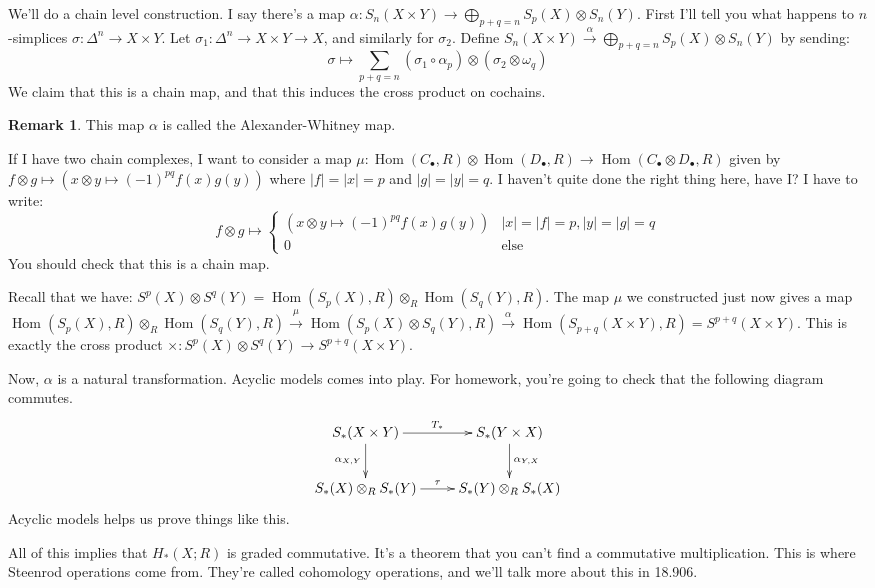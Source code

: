 \documentclass{amsart}
\theoremstyle{theorem}
\theoremstyle{definition}
\newtheorem{remark}[theorem]{Remark}
\DeclareMathOperator{\Hom}{Hom}
\begin{document}
We'll do a chain level construction. I say there's a map $\alpha:S_n(X\times Y)\to \bigoplus_{p+q=n}S_p(X)\otimes S_n(Y)$. First I'll tell you what happens to $n$-simplices $\sigma:\Delta^n\to X\times Y$. Let $\sigma_1:\Delta^n\to X\times Y\to X$, and similarly for $\sigma_2$. Define $S_n(X\times Y)\xrightarrow{\alpha} \bigoplus_{p+q=n}S_p(X)\otimes S_n(Y)$ by sending:
\begin{equation*}
\sigma\mapsto\sum_{p+q=n}(\sigma_1\circ\alpha_p)\otimes(\sigma_2\otimes\omega_q)
\end{equation*}
We claim that this is a chain map, and that this induces the cross product on cochains.
\begin{remark}
This map $\alpha$ is called the Alexander-Whitney map.
\end{remark}
If I have two chain complexes, I want to consider a map $\mu:\Hom(C_\bullet,R)\otimes \Hom(D_\bullet,R)\to \Hom(C_\bullet\otimes D_\bullet,R)$ given by $f\otimes g\mapsto(x\otimes y\mapsto (-1)^{pq}f(x)g(y))$ where $|f|=|x|=p$ and $|g|=|y|=q$. I haven't quite done the right thing here, have I? I have to write:
\begin{equation*}
f\otimes g\mapsto\begin{cases}
(x\otimes y\mapsto (-1)^{pq}f(x)g(y)) & |x|=|f|=p, |y|=|g|=q\\
0 & \text{else}
\end{cases}
\end{equation*}
You should check that this is a chain map.

Recall that we have: $S^p(X)\otimes S^q(Y)=\Hom(S_p(X),R)\otimes_R \Hom(S_q(Y),R)$. The map $\mu$ we constructed just now gives a map $\Hom(S_p(X),R)\otimes_R \Hom(S_q(Y),R)\xrightarrow{\mu}\Hom(S_p(X)\otimes S_q(Y),R)\xrightarrow{\alpha}\Hom(S_{p+q}(X\times Y),R)=S^{p+q}(X\times Y)$. This is exactly the cross product $\times:S^p(X)\otimes S^q(Y)\to S^{p+q}(X\times Y)$.

Now, $\alpha$ is a natural transformation. Acyclic models comes into play. For homework, you're going to check that the following diagram commutes.
\begin{equation*}
\xymatrix{S_\ast(X\times Y)\ar[r]^{T_\ast}\ar[d]_{\alpha_{X,Y}} & S_\ast(Y\times X)\ar[d]^{\alpha_{Y,X}}\\
S_\ast(X)\otimes_R S_\ast(Y)\ar[r]^{\tau} & S_\ast(Y)\otimes_R S_\ast(X)}
\end{equation*}
Acyclic models helps us prove things like this.

All of this implies that $ H_\ast(X;R)$ is graded commutative. It's a theorem that you can't find a commutative multiplication. This is where Steenrod operations come from. They're called cohomology operations, and we'll talk more about this in 18.906.
\end{document}
